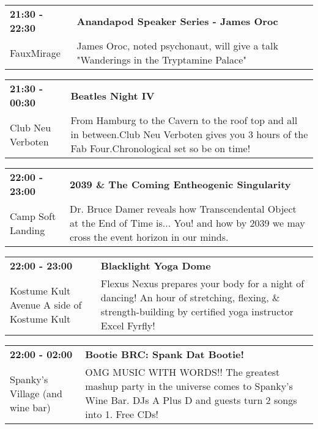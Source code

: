 \begin{tabular}{ p{1in} p{2.2in} }
    \textbf{21:30 - 22:30} & \textbf{Anandapod Speaker Series - James Oroc} \\
    FauxMirage \newline  & James Oroc, noted psychonaut, will give a talk "Wanderings in the Tryptamine Palace" \\
    \hline 
\end{tabular}
    
\begin{tabular}{ p{1in} p{2.2in} }
    \textbf{21:30 - 00:30} & \textbf{Beatles Night IV } \\
    Club Neu Verboten \newline  & From Hamburg to the Cavern to the roof top and all in between.Club Neu Verboten gives you 3 hours of the Fab Four.Chronological set so be on time! \\
    \hline 
\end{tabular}
    
\begin{tabular}{ p{1in} p{2.2in} }
    \textbf{22:00 - 23:00} & \textbf{2039 \& The Coming Entheogenic Singularity} \\
    Camp Soft Landing \newline  & Dr. Bruce Damer reveals how Transcendental Object at the End of Time is... You! and how by 2039 we may cross the event horizon in our minds. \\
    \hline 
\end{tabular}
    
\begin{tabular}{ p{1in} p{2.2in} }
    \textbf{22:00 - 23:00} & \textbf{Blacklight Yoga Dome} \\
    Kostume Kult \newline Avenue A side of Kostume Kult & Flexus Nexus prepares your body for a night of dancing! An hour of stretching, flexing, \& strength-building by certified yoga instructor Excel Fyrfly! \\
    \hline 
\end{tabular}
    
\begin{tabular}{ p{1in} p{2.2in} }
    \textbf{22:00 - 02:00} & \textbf{Bootie BRC: Spank Dat Bootie!} \\
    Spanky's Village (and wine bar) \newline  & OMG MUSIC WITH WORDS!! The greatest mashup party in the universe comes to Spanky's Wine Bar. DJs A Plus D and guests turn 2 songs into 1. Free CDs! \\
    \hline 
\end{tabular}
    
